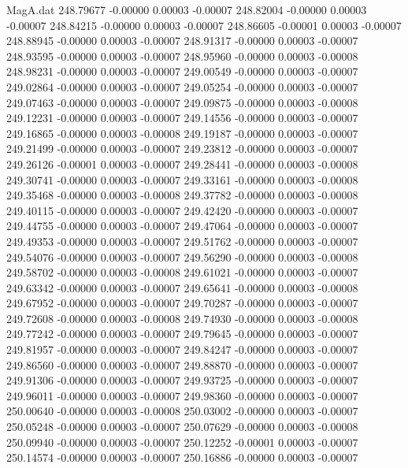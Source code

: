 \begin{filecontents}{MagA.dat}
 248.79677   -0.00000    0.00003   -0.00007
 248.82004   -0.00000    0.00003   -0.00007
 248.84215   -0.00000    0.00003   -0.00007
 248.86605   -0.00001    0.00003   -0.00007
 248.88945   -0.00000    0.00003   -0.00007
 248.91317   -0.00000    0.00003   -0.00007
 248.93595   -0.00000    0.00003   -0.00007
 248.95960   -0.00000    0.00003   -0.00008
 248.98231   -0.00000    0.00003   -0.00007
 249.00549   -0.00000    0.00003   -0.00007
 249.02864   -0.00000    0.00003   -0.00007
 249.05254   -0.00000    0.00003   -0.00007
 249.07463   -0.00000    0.00003   -0.00007
 249.09875   -0.00000    0.00003   -0.00008
 249.12231   -0.00000    0.00003   -0.00007
 249.14556   -0.00000    0.00003   -0.00007
 249.16865   -0.00000    0.00003   -0.00008
 249.19187   -0.00000    0.00003   -0.00007
 249.21499   -0.00000    0.00003   -0.00007
 249.23812   -0.00000    0.00003   -0.00007
 249.26126   -0.00001    0.00003   -0.00007
 249.28441   -0.00000    0.00003   -0.00008
 249.30741   -0.00000    0.00003   -0.00007
 249.33161   -0.00000    0.00003   -0.00008
 249.35468   -0.00000    0.00003   -0.00008
 249.37782   -0.00000    0.00003   -0.00008
 249.40115   -0.00000    0.00003   -0.00007
 249.42420   -0.00000    0.00003   -0.00007
 249.44755   -0.00000    0.00003   -0.00007
 249.47064   -0.00000    0.00003   -0.00007
 249.49353   -0.00000    0.00003   -0.00007
 249.51762   -0.00000    0.00003   -0.00007
 249.54076   -0.00000    0.00003   -0.00007
 249.56290   -0.00000    0.00003   -0.00008
 249.58702   -0.00000    0.00003   -0.00008
 249.61021   -0.00000    0.00003   -0.00007
 249.63342   -0.00000    0.00003   -0.00007
 249.65641   -0.00000    0.00003   -0.00008
 249.67952   -0.00000    0.00003   -0.00007
 249.70287   -0.00000    0.00003   -0.00007
 249.72608   -0.00000    0.00003   -0.00008
 249.74930   -0.00000    0.00003   -0.00008
 249.77242   -0.00000    0.00003   -0.00007
 249.79645   -0.00000    0.00003   -0.00007
 249.81957   -0.00000    0.00003   -0.00007
 249.84247   -0.00000    0.00003   -0.00007
 249.86560   -0.00000    0.00003   -0.00007
 249.88870   -0.00000    0.00003   -0.00007
 249.91306   -0.00000    0.00003   -0.00007
 249.93725   -0.00000    0.00003   -0.00007
 249.96011   -0.00000    0.00003   -0.00007
 249.98360   -0.00000    0.00003   -0.00007
 250.00640   -0.00000    0.00003   -0.00008
 250.03002   -0.00000    0.00003   -0.00007
 250.05248   -0.00000    0.00003   -0.00007
 250.07629   -0.00000    0.00003   -0.00008
 250.09940   -0.00000    0.00003   -0.00007
 250.12252   -0.00001    0.00003   -0.00007
 250.14574   -0.00000    0.00003   -0.00007
 250.16886   -0.00000    0.00003   -0.00007

\end{filecontents}
